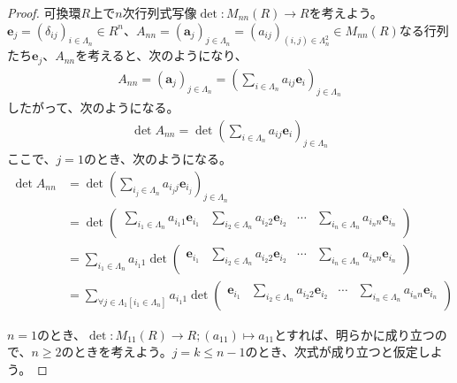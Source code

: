 \documentclass[dvipdfmx]{jsarticle}
\begin{document}
\begin{proof}
可換環$R$上で$n$次行列式写像$\det:M_{nn}(R) \rightarrow R$を考えよう。$\mathbf{e}_{j} = \left( \delta_{ij} \right)_{i \in \varLambda_{n}} \in R^{n}$、$A_{nn} = \left( \mathbf{a}_{j} \right)_{j \in \varLambda_{n}} = \left( a_{ij} \right)_{(i,j) \in \varLambda_{n}^{2}} \in M_{nn}(R)$なる行列たち$\mathbf{e}_{j}$、$A_{nn}$を考えると、次のようになり、
\begin{align*}
A_{nn} = \left( \mathbf{a}_{j} \right)_{j \in \varLambda_{n}} = \left( \sum_{i \in \varLambda_{n}} {a_{ij}\mathbf{e}_{i}} \right)_{j \in \varLambda_{n}}
\end{align*}
したがって、次のようになる。
\begin{align*}
\det A_{nn} = \det\left( \sum_{i \in \varLambda_{n}} {a_{ij}\mathbf{e}_{i}} \right)_{j \in \varLambda_{n}}
\end{align*}
ここで、$j = 1$のとき、次のようになる。
\begin{align*}
\det A_{nn} &= \det\left( \sum_{i_{j} \in \varLambda_{n}} {a_{i_{j}j}\mathbf{e}_{i_{j}}} \right)_{j \in \varLambda_{n}}\\
&= \det\begin{pmatrix}
\sum_{i_{1} \in \varLambda_{n}} {a_{i_{1}1}\mathbf{e}_{i_{1}}} & \sum_{i_{2} \in \varLambda_{n}} {a_{i_{2}2}\mathbf{e}_{i_{2}}} & \cdots & \sum_{i_{n} \in \varLambda_{n}} {a_{i_{n}n}\mathbf{e}_{i_{n}}} \\
\end{pmatrix}\\
&= \sum_{i_{1} \in \varLambda_{n}} {a_{i_{1}1}\det\begin{pmatrix}
\mathbf{e}_{i_{1}} & \sum_{i_{2} \in \varLambda_{n}} {a_{i_{2}2}\mathbf{e}_{i_{2}}} & \cdots & \sum_{i_{n} \in \varLambda_{n}} {a_{i_{n}n}\mathbf{e}_{i_{n}}} \\
\end{pmatrix}}\\
&= \sum_{\forall j \in \varLambda_{1}\left[ i_{1} \in \varLambda_{n} \right]} {a_{i_{1}1}\det\begin{pmatrix}
\mathbf{e}_{i_{1}} & \sum_{i_{2} \in \varLambda_{n}} {a_{i_{2}2}\mathbf{e}_{i_{2}}} & \cdots & \sum_{i_{n} \in \varLambda_{n}} {a_{i_{n}n}\mathbf{e}_{i_{n}}} \\
\end{pmatrix}}
\end{align*}\par
$n = 1$のとき、$\det:M_{11}(R) \rightarrow R;\left( a_{11} \right) \mapsto a_{11}$とすれば、明らかに成り立つので、$n \geq 2$のときを考えよう。$j = k \leq n - 1$のとき、次式が成り立つと仮定しよう。

\end{proof}
\end{document}

